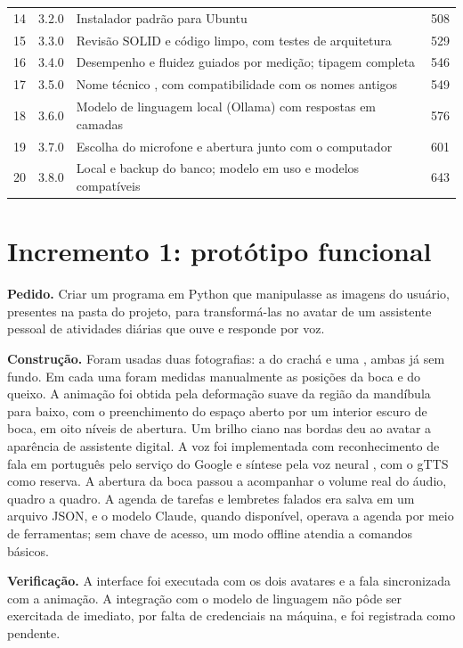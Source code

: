 \begin{singlespace}
\begin{tabularx}{\textwidth}{C{0.8cm}C{1.6cm}LC{2.2cm}}
14 & 3.2.0  & Instalador padrão para Ubuntu & 508 \\
15 & 3.3.0  & Revisão SOLID e código limpo, com testes de arquitetura & 529 \\
16 & 3.4.0  & Desempenho e fluidez guiados por medição; tipagem completa & 546 \\
17 & 3.5.0  & Nome técnico , com compatibilidade com os nomes antigos & 549 \\
18 & 3.6.0  & Modelo de linguagem local (Ollama) com respostas em camadas & 576 \\
19 & 3.7.0  & Escolha do microfone e abertura junto com o computador & 601 \\
20 & 3.8.0  & Local e backup do banco; modelo em uso e modelos compatíveis & 643 \\
\bottomrule
\end{tabularx}
\end{singlespace}

\section{Incremento 1: protótipo funcional}

\textbf{Pedido.} Criar um programa em Python que manipulasse as imagens do usuário, presentes na pasta
do projeto, para transformá-las no avatar de um assistente pessoal de atividades diárias que ouve e
responde por voz.

\textbf{Construção.} Foram usadas duas fotografias: a do crachá e uma , ambas já sem
fundo. Em cada uma foram medidas manualmente as posições da boca e do queixo. A animação foi obtida pela
deformação suave da região da mandíbula para baixo, com o preenchimento do espaço aberto por um interior
escuro de boca, em oito níveis de abertura. Um brilho ciano nas bordas deu ao avatar a aparência de
assistente digital. A voz foi implementada com reconhecimento de fala em português pelo serviço do Google
e síntese pela voz neural , com o gTTS como reserva. A abertura da boca passou a
acompanhar o volume real do áudio, quadro a quadro. A agenda de tarefas e lembretes falados era salva em
um arquivo JSON, e o modelo Claude, quando disponível, operava a agenda por meio de ferramentas; sem
chave de acesso, um modo offline atendia a comandos básicos.

\textbf{Verificação.} A interface foi executada com os dois avatares e a fala sincronizada com a
animação. A integração com o modelo de linguagem não pôde ser exercitada de imediato, por falta de
credenciais na máquina, e foi registrada como pendente.

